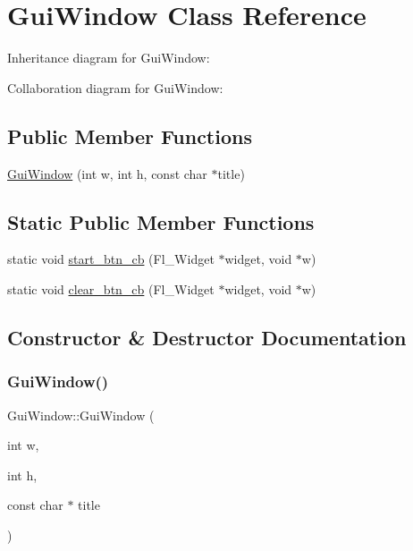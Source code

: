 \hypertarget{classGuiWindow}{}\section{Gui\+Window Class Reference}
\label{classGuiWindow}


Inheritance diagram for Gui\+Window\+:


Collaboration diagram for Gui\+Window\+:
\subsection*{Public Member Functions}
\begin{DoxyCompactItemize}
\item 
\hyperlink{classGuiWindow_a6c0470142b2c8b161cd7d2d247eb7841}{Gui\+Window} (int w, int h, const char $\ast$title)
\end{DoxyCompactItemize}
\subsection*{Static Public Member Functions}
\begin{DoxyCompactItemize}
\item 
static void \hyperlink{classGuiWindow_af16391005bf54c5fd789d6797ead1e37}{start\+\_\+btn\+\_\+cb} (Fl\+\_\+\+Widget $\ast$widget, void $\ast$w)
\item 
static void \hyperlink{classGuiWindow_a69b67adfbd43752c1ca82958279bb000}{clear\+\_\+btn\+\_\+cb} (Fl\+\_\+\+Widget $\ast$widget, void $\ast$w)
\end{DoxyCompactItemize}


\subsection{Constructor \& Destructor Documentation}
\mbox{\label{classGuiWindow_a6c0470142b2c8b161cd7d2d247eb7841}} 
\subsubsection{\texorpdfstring{Gui\+Window()}{GuiWindow()}}
{\footnotesize\ttfamily Gui\+Window\+::\+Gui\+Window (\begin{DoxyParamCaption}\item[{int}]{w,  }\item[{int}]{h,  }\item[{const char $\ast$}]{title }\end{DoxyParamCaption})\hspace{0.3cm}{\ttfamily [inline]}}

